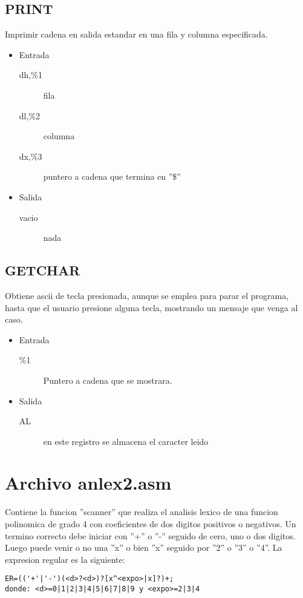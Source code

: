 \subsection{PRINT}
\label{sec-1-15}
Imprimir cadena en salida estandar en una fila y columna
especificada.
\begin{itemize}
\item Entrada
\begin{description}
\item[dh,\%1] fila
\item[dl,\%2] columna
\item[dx,\%3] puntero a cadena que termina en ''\$''
\end{description}
\item Salida
\begin{description}
\item[vacio] nada
\end{description}
\end{itemize}

\subsection{GETCHAR}
\label{sec-1-16}
Obtiene ascii de tecla presionada, aunque se emplea para
parar el programa, hasta que el usuario presione alguna
tecla, mostrando un mensaje que venga al caso.
\begin{itemize}
\item Entrada
\begin{description}
\item[\%1] Puntero a cadena que se mostrara.
\end{description}
\item Salida
\begin{description}
\item[AL] en este registro se almacena el caracter leido
\end{description}
\end{itemize}

\section{Archivo anlex2.asm}
\label{sec-2}
Contiene la funcion ''scanner'' que realiza el analisis lexico de una
funcion polinomica de grado 4 con coeficientes de dos digitos
positivos o negativos. Un termino correcto debe iniciar con ''+'' o ''-''
seguido de cero, uno o dos digitos. Luego puede venir o no una ''x'' o
bien ''x'' seguido por ''2'' o ''3'' o ''4''. La expresion regular es la
siguiente:
\begin{verbatim}
ER=(('+'|'-')(<d>?<d>)?[x^<expo>|x]?)+;
donde: <d>=0|1|2|3|4|5|6|7|8|9 y <expo>=2|3|4
\end{verbatim}

